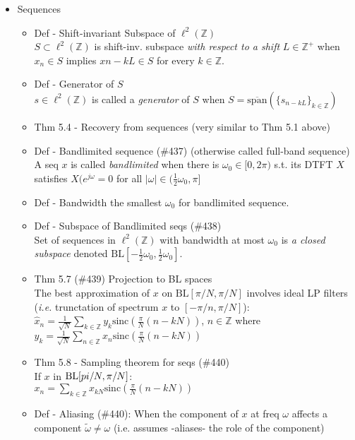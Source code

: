 \documentclass{article}
\newcommand{\ie}{\textit{i.e. }}
\newcommand{\cg}{\color{gray}}
\newcommand{\fs}{\footnotesize}
\begin{document}
\begin{itemize}
\item Sequences
\begin{itemize}
\item Def \-- Shift-invariant Subspace of $\ell^2(\mathbb{Z})$ \\
{\cg\fs
$S\subset \ell^2(\mathbb{Z})$ is shift-inv. subspace \textit{with respect to a shift} $L\in\mathbb{Z}^+$ when $x{_n\in S}$ implies $x{n-kL}\in S$ for every $k\in\mathbb{Z}$.}
\item Def \-- Generator of $S$ \\
{\cg\fs
$s\in\ell^2(\mathbb{Z})$ is called a \textit{generator} of $S$ when $S=\overline{\text{span}}(\{s_{n-kL}\}_{k\in\mathbb{Z}})$
}
\item Thm 5.4 \-- Recovery from sequences (very similar to Thm 5.1 above)
\item Def \-- Bandlimited sequence (\#437) {\cg(otherwise called full-band sequence)}\\
{\cg\fs
A seq $x$ is called \textit{bandlimited} when there is $\omega_0\in[0,2\pi)$ s.t. its DTFT $X$ satisfies $X(e^{j\omega}=0$ for all $|\omega|\in (\frac{1}{2}\omega_0,\pi]$
}
\item Def \-- Bandwidth {\cg the smallest $\omega_0$ for bandlimited sequence.}
\item Def \-- Subspace of Bandlimited seqs (\#438) \\
{\cg\fs Set of sequences in $\ell^2(\mathbb{Z})$ with bandwidth at most $\omega_0$ is \textit{a closed subspace} denoted $\text{BL}[-\frac{1}{2}\omega_0,\frac{1}{2}\omega_0]$. }
\item Thm 5.7 (\#439) Projection to BL spaces \\
{\cg\fs The best approximation of $x$ on $\text{BL}[\pi/N,\pi/N]$ involves ideal LP filters (\ie trunctation of spectrum $x$ to $[-\pi/n,\pi/N]$):\\
$\hat{x}_n=\frac{1}{\sqrt{N}}\sum\limits_{k\in\mathbb{Z}}y_k \text{sinc}(\frac{\pi}{N}(n-kN))$, $n\in\mathbb{Z}$ where \\
$y_k=\frac{1}{\sqrt{N}}\sum\limits_{n\in\mathbb{Z}}x_n\text{sinc}(\frac{\pi}{N}(n-kN))$}
\item Thm 5.8 \-- Sampling theorem for seqs (\#440) \\
{\cg\fs
If $x$ in $\text{BL}[\-pi/N,\pi/N]$: \\
$x_n=\sum\limits_{k\in\mathbb{Z}}x_{kN}\text{sinc}(\frac{\pi}{N}(n-kN))$
}
\item Def \-- Aliasing (\#440): {\cg When the component of $x$ at freq $\omega$ affects a component $\tilde{\omega}\neq \omega$ (i.e. assumes \--aliases\-- the role of the component)}

\end{itemize}
\end{itemize}
\end{document}
